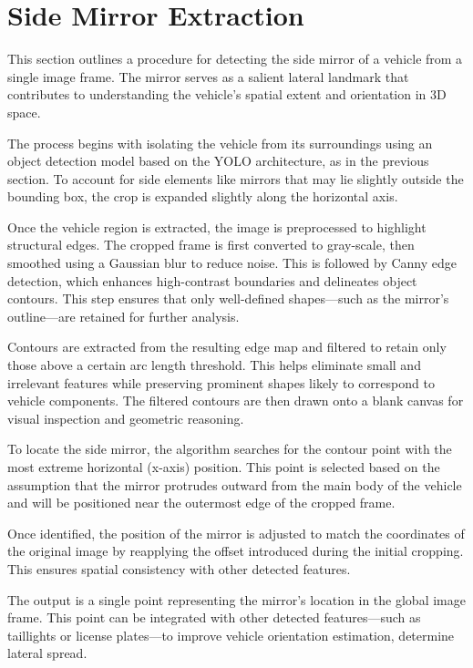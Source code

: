 \section{Side Mirror Extraction}
This section outlines a procedure for detecting the side mirror of a vehicle from a single image frame. The mirror serves as a salient lateral landmark that contributes to understanding the vehicle's spatial extent and orientation in 3D space.

The process begins with isolating the vehicle from its surroundings using an object detection model based on the YOLO architecture, as in the previous section. To account for side elements like mirrors that may lie slightly outside the bounding box, the crop is expanded slightly along the horizontal axis.

Once the vehicle region is extracted, the image is preprocessed to highlight structural edges. The cropped frame is first converted to gray-scale, then smoothed using a Gaussian blur to reduce noise. This is followed by Canny edge detection, which enhances high-contrast boundaries and delineates object contours. This step ensures that only well-defined shapes—such as the mirror's outline—are retained for further analysis.

Contours are extracted from the resulting edge map and filtered to retain only those above a certain arc length threshold. This helps eliminate small and irrelevant features while preserving prominent shapes likely to correspond to vehicle components. The filtered contours are then drawn onto a blank canvas for visual inspection and geometric reasoning.

To locate the side mirror, the algorithm searches for the contour point with the most extreme horizontal (x-axis) position. This point is selected based on the assumption that the mirror protrudes outward from the main body of the vehicle and will be positioned near the outermost edge of the cropped frame.

Once identified, the position of the mirror is adjusted to match the coordinates of the original image by reapplying the offset introduced during the initial cropping. This ensures spatial consistency with other detected features.

The output is a single point representing the mirror's location in the global image frame. This point can be integrated with other detected features—such as taillights or license plates—to improve vehicle orientation estimation, determine lateral spread.

